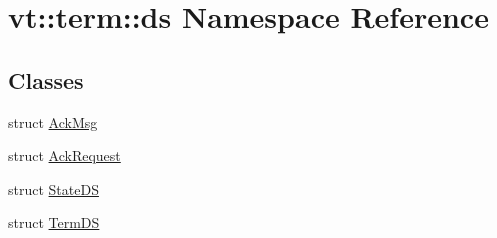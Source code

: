 \hypertarget{namespacevt_1_1term_1_1ds}{}\section{vt\+:\+:term\+:\+:ds Namespace Reference}
\label{namespacevt_1_1term_1_1ds}
\subsection*{Classes}
\begin{DoxyCompactItemize}
\item 
struct \hyperlink{structvt_1_1term_1_1ds_1_1_ack_msg}{Ack\+Msg}
\item 
struct \hyperlink{structvt_1_1term_1_1ds_1_1_ack_request}{Ack\+Request}
\item 
struct \hyperlink{structvt_1_1term_1_1ds_1_1_state_d_s}{State\+DS}
\item 
struct \hyperlink{structvt_1_1term_1_1ds_1_1_term_d_s}{Term\+DS}
\end{DoxyCompactItemize}
